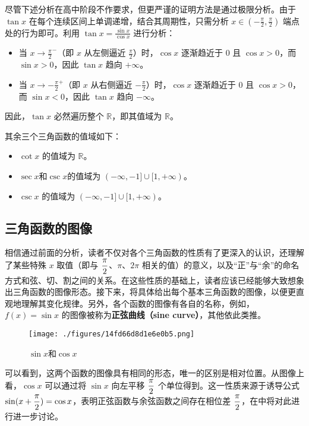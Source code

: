 尽管下述分析在高中阶段不作要求，但更严谨的证明方法是通过极限分析。由于 $\tan x$ 在每个连续区间上单调递增，结合其周期性，只需分析 $\displaystyle x\in\left(-\frac{\pi}{2},\frac{\pi}{2}\right)$ 端点处的行为即可。利用 $\displaystyle \tan x = \frac{\sin x}{\cos x}$ 进行分析：

\begin{itemize}
\item 当 $\displaystyle x \to \frac{\pi}{2}^-$（即 $x$ 从左侧逼近 $\displaystyle \frac{\pi}{2}$）时，$\cos x$ 逐渐趋近于 $0$ 且 $\cos x > 0$，而 $\sin x > 0$，因此 $\tan x$ 趋向 $+\infty$。
\item 当 $\displaystyle x \to -\frac{\pi}{2}^+$（即 $x$ 从右侧逼近 $\displaystyle -\frac{\pi}{2}$）时，$\cos x$ 逐渐趋近于 $0$ 且 $\cos x > 0$，而 $\sin x < 0$，因此 $\tan x$ 趋向 $-\infty$。
\end{itemize}

因此，$\tan x$ 必然遍历整个 $\mathbb{R}$，即其值域为 $\mathbb{R}$。

其余三个三角函数的值域如下：
\begin{itemize}
\item $\cot x$ 的值域为 $\mathbb{R}$。
\item $\sec x$和$\csc x$的值域为 $(-\infty, -1] \cup [1, +\infty)$。
\item $\csc x$ 的值域为 $(-\infty, -1] \cup [1, +\infty)$。
\end{itemize}

\subsection{三角函数的图像}

相信通过前面的分析，读者不仅对各个三角函数的性质有了更深入的认识，还理解了某些特殊 $x$ 取值（即与 $\displaystyle{\pi\over2}$、$\pi$、$2\pi$ 相关的值）的意义，以及“正”与“余”的命名方式和弦、切、割之间的关系。在这些性质的基础上，读者应该已经能够大致想象出三角函数的图像形态。接下来，将具体给出每个基本三角函数的图像，以便更直观地理解其变化规律。另外，各个函数的图像有各自的名称，例如，$f(x) = \sin x$ 的图像被称为\textbf{正弦曲线（sine curve）}，其他依此类推。

\begin{figure}[ht]
\centering
\texttt{[image: ./figures/14fd66d8d1e6e0b5.png]}
\caption{$\sin x$和$\cos x$} \label{fig_HsTFFv_1}
\end{figure}

可以看到，这两个函数的图像具有相同的形态，唯一的区别是相对位置。从图像上看，$\cos x$ 可以通过将 $\sin x$ 向左平移 $\displaystyle{\pi\over2}$ 个单位得到。这一性质来源于诱导公式 $\displaystyle\sin(x + {\pi\over2}) = \cos x$，表明正弦函数与余弦函数之间存在相位差 $\displaystyle{\pi\over2}$，在中将对此进行进一步讨论。

